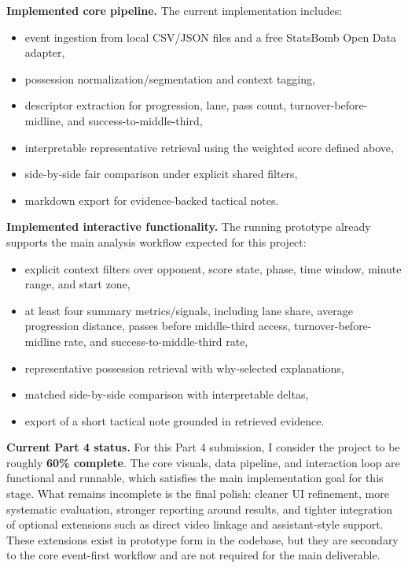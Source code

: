 \documentclass{vgtc}                          %
\begin{document}
\noindent\textbf{Implemented core pipeline.}
The current implementation includes:
\begin{itemize}[leftmargin=*]
\item event ingestion from local CSV/JSON files and a free StatsBomb Open Data adapter,
\item possession normalization/segmentation and context tagging,
\item descriptor extraction for progression, lane, pass count, turnover-before-midline, and success-to-middle-third,
\item interpretable representative retrieval using the weighted score defined above,
\item side-by-side fair comparison under explicit shared filters,
\item markdown export for evidence-backed tactical notes.
\end{itemize}

\noindent\textbf{Implemented interactive functionality.}
The running prototype already supports the main analysis workflow expected for this project:
\begin{itemize}[leftmargin=*]
\item explicit context filters over opponent, score state, phase, time window, minute range, and start zone,
\item at least four summary metrics/signals, including lane share, average progression distance, passes before middle-third access, turnover-before-midline rate, and success-to-middle-third rate,
\item representative possession retrieval with why-selected explanations,
\item matched side-by-side comparison with interpretable deltas,
\item export of a short tactical note grounded in retrieved evidence.
\end{itemize}

\noindent\textbf{Current Part 4 status.}
For this Part 4 submission, I consider the project to be roughly \textbf{60\% complete}. The core visuals, data pipeline, and interaction loop are functional and runnable, which satisfies the main implementation goal for this stage. What remains incomplete is the final polish: cleaner UI refinement, more systematic evaluation, stronger reporting around results, and tighter integration of optional extensions such as direct video linkage and assistant-style support. These extensions exist in prototype form in the codebase, but they are secondary to the core event-first workflow and are not required for the main deliverable.
\end{document}
